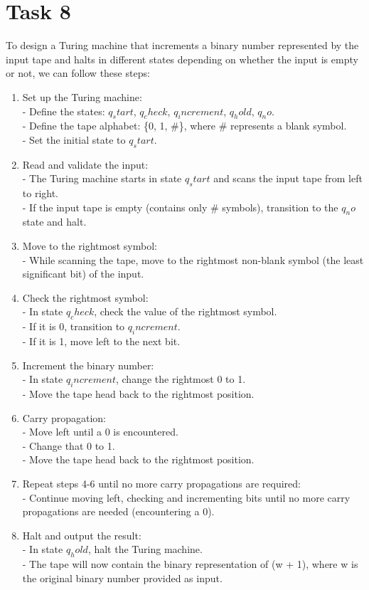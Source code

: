 \chapter{Task 8}
To design a Turing machine that increments a binary number represented by the input tape and halts in different states depending on whether the input is empty or not, we can follow these steps:
\begin{enumerate}

\item Set up the Turing machine:\\
   - Define the states: $q_start$, $q_check$, $q_increment$, $q_hold$, $q_no$.\\
   - Define the tape alphabet: \{0, 1, \#\}, where \# represents a blank symbol.\\
   - Set the initial state to $q_start$.

\item Read and validate the input:\\
   - The Turing machine starts in state $q_start$ and scans the input tape from left to right.\\
   - If the input tape is empty (contains only \# symbols), transition to the $q_no$ state and halt.

\item Move to the rightmost symbol:\\
   - While scanning the tape, move to the rightmost non-blank symbol (the least significant bit) of the input.
   
\item Check the rightmost symbol:\\
   - In state $q_check$, check the value of the rightmost symbol.\\
   - If it is 0, transition to $q_increment$.\\
   - If it is 1, move left to the next bit.

\item Increment the binary number:\\
   - In state $q_increment$, change the rightmost 0 to 1.\\
   - Move the tape head back to the rightmost position.

\item Carry propagation:\\
   - Move left until a 0 is encountered.\\
   - Change that 0 to 1.\\
   - Move the tape head back to the rightmost position.

\item Repeat steps 4-6 until no more carry propagations are required:\\
   - Continue moving left, checking and incrementing bits until no more carry propagations are needed (encountering a 0).

\item Halt and output the result:\\
   - In state $q_hold$, halt the Turing machine.\\
   - The tape will now contain the binary representation of (w + 1), where w is the original binary number provided as input.
\end{enumerate}
